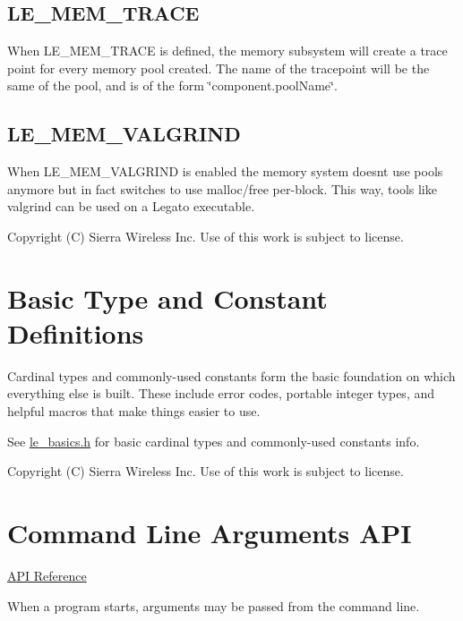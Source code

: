\hypertarget{c_le_build_cfg_bld_cfg_mem_trace}{}\subsection{L\+E\+\_\+\+M\+E\+M\+\_\+\+T\+R\+A\+C\+E}\label{c_le_build_cfg_bld_cfg_mem_trace}
When {\ttfamily L\+E\+\_\+\+M\+E\+M\+\_\+\+T\+R\+A\+C\+E} is defined, the memory subsystem will create a trace point for every memory pool created. The name of the tracepoint will be the same of the pool, and is of the form \char`\"{}component.\+pool\+Name\char`\"{}.\hypertarget{c_le_build_cfg_bld_cfg_mem_valgrind}{}\subsection{L\+E\+\_\+\+M\+E\+M\+\_\+\+V\+A\+L\+G\+R\+I\+N\+D}\label{c_le_build_cfg_bld_cfg_mem_valgrind}
When {\ttfamily L\+E\+\_\+\+M\+E\+M\+\_\+\+V\+A\+L\+G\+R\+I\+N\+D} is enabled the memory system doesn\textquotesingle{}t use pools anymore but in fact switches to use malloc/free per-\/block. This way, tools like valgrind can be used on a Legato executable.





Copyright (C) Sierra Wireless Inc. Use of this work is subject to license. \hypertarget{c_basics}{}\section{Basic Type and Constant Definitions}\label{c_basics}
Cardinal types and commonly-\/used constants form the basic foundation on which everything else is built. These include error codes, portable integer types, and helpful macros that make things easier to use.

See \hyperlink{le__basics_8h}{le\+\_\+basics.\+h} for basic cardinal types and commonly-\/used constants info.





Copyright (C) Sierra Wireless Inc. Use of this work is subject to license. \hypertarget{c_args}{}\section{Command Line Arguments A\+P\+I}\label{c_args}
\hyperlink{le__args_8h}{A\+P\+I Reference}





When a program starts, arguments may be passed from the command line.


